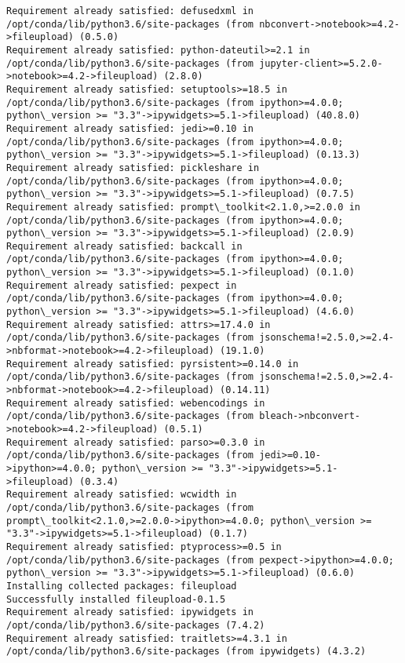 \documentclass[11pt]{article}
\begin{document}
\begin{Verbatim}[commandchars=\\\{\}]
Requirement already satisfied: defusedxml in /opt/conda/lib/python3.6/site-packages (from nbconvert->notebook>=4.2->fileupload) (0.5.0)
Requirement already satisfied: python-dateutil>=2.1 in /opt/conda/lib/python3.6/site-packages (from jupyter-client>=5.2.0->notebook>=4.2->fileupload) (2.8.0)
Requirement already satisfied: setuptools>=18.5 in /opt/conda/lib/python3.6/site-packages (from ipython>=4.0.0; python\_version >= "3.3"->ipywidgets>=5.1->fileupload) (40.8.0)
Requirement already satisfied: jedi>=0.10 in /opt/conda/lib/python3.6/site-packages (from ipython>=4.0.0; python\_version >= "3.3"->ipywidgets>=5.1->fileupload) (0.13.3)
Requirement already satisfied: pickleshare in /opt/conda/lib/python3.6/site-packages (from ipython>=4.0.0; python\_version >= "3.3"->ipywidgets>=5.1->fileupload) (0.7.5)
Requirement already satisfied: prompt\_toolkit<2.1.0,>=2.0.0 in /opt/conda/lib/python3.6/site-packages (from ipython>=4.0.0; python\_version >= "3.3"->ipywidgets>=5.1->fileupload) (2.0.9)
Requirement already satisfied: backcall in /opt/conda/lib/python3.6/site-packages (from ipython>=4.0.0; python\_version >= "3.3"->ipywidgets>=5.1->fileupload) (0.1.0)
Requirement already satisfied: pexpect in /opt/conda/lib/python3.6/site-packages (from ipython>=4.0.0; python\_version >= "3.3"->ipywidgets>=5.1->fileupload) (4.6.0)
Requirement already satisfied: attrs>=17.4.0 in /opt/conda/lib/python3.6/site-packages (from jsonschema!=2.5.0,>=2.4->nbformat->notebook>=4.2->fileupload) (19.1.0)
Requirement already satisfied: pyrsistent>=0.14.0 in /opt/conda/lib/python3.6/site-packages (from jsonschema!=2.5.0,>=2.4->nbformat->notebook>=4.2->fileupload) (0.14.11)
Requirement already satisfied: webencodings in /opt/conda/lib/python3.6/site-packages (from bleach->nbconvert->notebook>=4.2->fileupload) (0.5.1)
Requirement already satisfied: parso>=0.3.0 in /opt/conda/lib/python3.6/site-packages (from jedi>=0.10->ipython>=4.0.0; python\_version >= "3.3"->ipywidgets>=5.1->fileupload) (0.3.4)
Requirement already satisfied: wcwidth in /opt/conda/lib/python3.6/site-packages (from prompt\_toolkit<2.1.0,>=2.0.0->ipython>=4.0.0; python\_version >= "3.3"->ipywidgets>=5.1->fileupload) (0.1.7)
Requirement already satisfied: ptyprocess>=0.5 in /opt/conda/lib/python3.6/site-packages (from pexpect->ipython>=4.0.0; python\_version >= "3.3"->ipywidgets>=5.1->fileupload) (0.6.0)
Installing collected packages: fileupload
Successfully installed fileupload-0.1.5
Requirement already satisfied: ipywidgets in /opt/conda/lib/python3.6/site-packages (7.4.2)
Requirement already satisfied: traitlets>=4.3.1 in /opt/conda/lib/python3.6/site-packages (from ipywidgets) (4.3.2)

\end{Verbatim}
\end{document}
